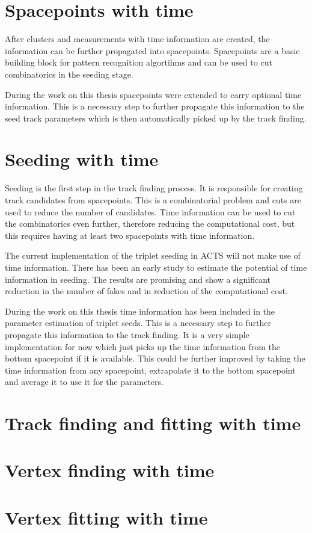 \section{Spacepoints with time}

After clusters and measurements with time information are created, the information can be further propagated into spacepoints. Spacepoints are a basic building block for pattern recognition algortihms and can be used to cut combinatorics in the seeding stage.

During the work on this thesis spacepoints were extended to carry optional time information. This is a necessary step to further propagate this information to the seed track parameters which is then automatically picked up by the track finding.

\section{Seeding with time}

Seeding is the first step in the track finding process. It is responsible for creating track candidates from spacepoints. This is a combinatorial problem and cuts are used to reduce the number of candidates. Time information can be used to cut the combinatorics even further, therefore reducing the computational cost, but this requires having at least two spacepoints with time information.

The current implementation of the triplet seeding in ACTS will not make use of time information. There has been an early study to estimate the potential of time information in seeding. The results are promising and show a significant reduction in the number of fakes and in reduction of the computational cost.

During the work on this thesis time information has been included in the parameter estimation of triplet seeds. This is a necessary step to further propagate this information to the track finding. It is a very simple implementation for now which just picks up the time information from the bottom spacepoint if it is available. This could be further improved by taking the time information from any spacepoint, extrapolate it to the bottom spacepoint and average it to use it for the parameters.

\section{Track finding and fitting with time}

\section{Vertex finding with time}

\section{Vertex fitting with time}
